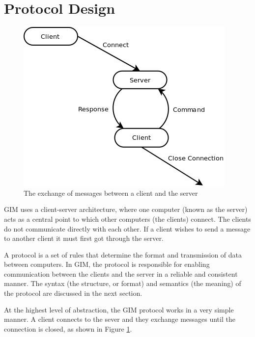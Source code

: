 \newcommand\SLASH{\char`\\}

\section{Protocol Design}

\label{protocol_design}

\begin{figure}
    \begin{center}
        \includegraphics[scale=0.65]{Design/diagrams/protocol_high_level.png}
        \caption{The exchange of messages between a client and the server}
        \label{highLevelProtoDia}
    \end{center}
\end{figure}

GIM uses a client-server architecture, where one computer (known as the server) acts as a central point to which other computers (the clients) connect. The clients do not communicate directly with each other. If a client wishes to send a message to another client it must first got through the server.

A protocol is a set of rules that determine the format and transmission of data between computers. In GIM, the protocol is responsible for enabling communication between the clients and the server in a reliable and consistent manner.  The syntax (the structure, or format) and semantics (the meaning) of the protocol are discussed in the next section.

At the highest level of abstraction, the GIM protocol works in a very simple manner.  A client connects to the sever and they exchange messages until the connection is closed, as shown in Figure \ref{highLevelProtoDia}.

